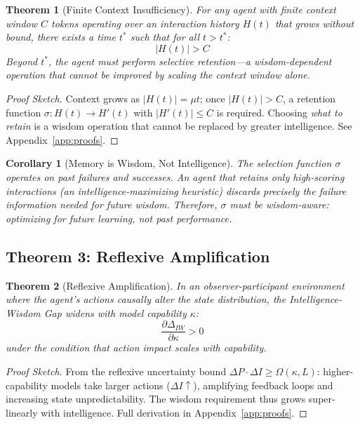 \documentclass{article}
\newtheorem{theorem}{Theorem}
\newtheorem{corollary}{Corollary}
\begin{document}
\begin{theorem}[Finite Context Insufficiency]
\label{thm:context}
For any agent with finite context window $C$ tokens operating over an
interaction history $H(t)$ that grows without bound, there exists a time
$t^*$ such that for all $t > t^*$:
\begin{equation}
  |H(t)| > C
\end{equation}
Beyond $t^*$, the agent must perform selective retention---a
wisdom-dependent operation that cannot be improved by scaling the context
window alone.
\end{theorem}

\begin{proof}[Proof Sketch]
Context grows as $|H(t)|=\mu t$; once $|H(t)|>C$, a retention function
$\sigma: H(t)\to H'(t)$ with $|H'(t)|\leq C$ is required.
Choosing \emph{what to retain} is a wisdom operation that cannot be
replaced by greater intelligence. See Appendix~\ref{app:proofs}.
\end{proof}

\begin{corollary}[Memory is Wisdom, Not Intelligence]
\label{cor:memory}
The selection function $\sigma$ operates on past failures and
successes. An agent that retains only high-scoring interactions
(an intelligence-maximizing heuristic) discards precisely the
failure information needed for future wisdom. Therefore,
$\sigma$ must be wisdom-aware: optimizing for future learning,
not past performance.
\end{corollary}

\subsection{Theorem 3: Reflexive Amplification}

\begin{theorem}[Reflexive Amplification]
\label{thm:reflexive}
In an observer-participant environment~\cite{reflexive_intelligence}
where the agent's actions causally alter the state distribution, the
Intelligence-Wisdom Gap widens with model capability $\kappa$:
\begin{equation}
  \frac{\partial \Delta_{IW}}{\partial \kappa} > 0
\end{equation}
under the condition that action impact scales with capability.
\end{theorem}

\begin{proof}[Proof Sketch]
From the reflexive uncertainty bound $\Delta P\cdot\Delta I\geq\Omega(\kappa,L)$:
higher-capability models take larger actions ($\Delta I\uparrow$), amplifying
feedback loops and increasing state unpredictability. The wisdom requirement thus
grows super-linearly with intelligence. Full derivation in Appendix~\ref{app:proofs}.
\end{proof}
\end{document}
